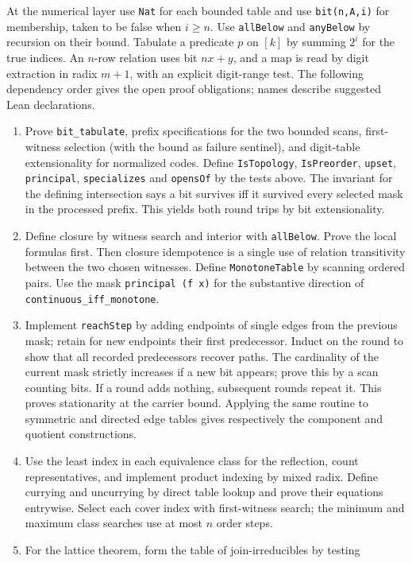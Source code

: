 At the numerical layer use \texttt{Nat} for each bounded table and use
\texttt{bit(n,A,i)} for membership, taken to be false when $i\ge n$.
Use \texttt{allBelow} and \texttt{anyBelow} by recursion on their bound.
Tabulate a predicate $p$ on $[k]$ by summing $2^i$ for the true indices.
An $n$-row relation uses bit $nx+y$, and a map is read by digit extraction
in radix $m+1$, with an explicit digit-range test. The following dependency
order gives the open proof obligations; names describe suggested Lean
declarations.
\begin{enumerate}
\item Prove \texttt{bit\_tabulate}, prefix specifications for the two
bounded scans, first-witness selection (with the bound as failure sentinel),
and digit-table extensionality for normalized codes. Define
\texttt{IsTopology}, \texttt{IsPreorder}, \texttt{upset}, \texttt{principal},
\texttt{specializes} and \texttt{opensOf} by the tests above. The invariant
for the defining intersection says a bit survives iff it survived every
selected mask in the processed prefix. This yields both round trips
by bit extensionality.
\item Define closure by witness search and interior with \texttt{allBelow}.
Prove the local formulas first. Then closure idempotence is a single use
of relation transitivity between the two chosen witnesses. Define
\texttt{MonotoneTable} by scanning ordered pairs. Use the mask
\texttt{principal (f x)} for the substantive direction of
\texttt{continuous\_iff\_monotone}.
\item Implement \texttt{reachStep} by adding endpoints of single edges
from the previous mask; retain for new endpoints their first predecessor.
Induct on the round to show that all recorded predecessors recover paths.
The cardinality of the current mask strictly increases if a new bit
appears; prove this by a scan counting bits. If a round adds nothing,
subsequent rounds repeat it. This proves stationarity at the carrier
bound. Applying the same routine to symmetric and directed edge tables
gives respectively the component and quotient constructions.
\item Use the least index in each equivalence class for the reflection,
count representatives, and implement product indexing by mixed radix.
Define currying and uncurrying by direct table lookup and prove their
equations entrywise. Select each cover index with first-witness search;
the minimum and maximum class searches use at most $n$ order steps.
\item For the lattice theorem, form the table of join-irreducibles by testing

\end{enumerate}
